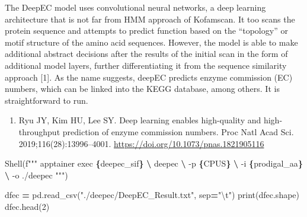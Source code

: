 \documentclass[
]{book}
\newenvironment{Shaded}{\begin{snugshade}}{\end{snugshade}}
\newcommand{\BuiltInTok}[1]{#1}
\newcommand{\CharTok}[1]{\textcolor[rgb]{0.31,0.60,0.02}{#1}}
\newcommand{\DecValTok}[1]{\textcolor[rgb]{0.00,0.00,0.81}{#1}}
\newcommand{\NormalTok}[1]{#1}
\newcommand{\OperatorTok}[1]{\textcolor[rgb]{0.81,0.36,0.00}{\textbf{#1}}}
\newcommand{\SpecialCharTok}[1]{\textcolor[rgb]{0.81,0.36,0.00}{\textbf{#1}}}
\newcommand{\SpecialStringTok}[1]{\textcolor[rgb]{0.31,0.60,0.02}{#1}}
\newcommand{\StringTok}[1]{\textcolor[rgb]{0.31,0.60,0.02}{#1}}
\providecommand{\tightlist}{%
  \setlength{\itemsep}{0pt}\setlength{\parskip}{0pt}}
\begin{document}
The DeepEC model uses convolutional neural networks, a deep learning architecture that is not far from HMM approach of Kofamscan.
It too scans the protein sequence and attempts to predict function based on the ``topology'' or motif structure of the amino acid sequences.
However, the model is able to make additional abstract decisions after the results of the initial scan in the form of additional model layers,
further differentiating it from the sequence similarity approach {[}1{]}. As the name suggests, deepEC predicts enzyme commission (EC) numbers,
which can be linked into the KEGG database, among others. It is straightforward to run.

\begin{enumerate}
\def\labelenumi{\arabic{enumi}.}
\tightlist
\item
  Ryu JY, Kim HU, Lee SY. Deep learning enables high-quality and high-throughput prediction of enzyme commission numbers. Proc Natl Acad Sci. 2019;116(28):13996--4001. \url{https://doi.org/10.1073/pnas.1821905116}
\end{enumerate}

\begin{Shaded}
\begin{Highlighting}[numbers=left,,]
\NormalTok{Shell(}\SpecialStringTok{f"""}
\SpecialStringTok{apptainer exec }\SpecialCharTok{\{}\NormalTok{deepec\_sif}\SpecialCharTok{\}}\SpecialStringTok{ }\OperatorTok{\textbackslash{}}
\SpecialStringTok{    deepec }\OperatorTok{\textbackslash{}}
\SpecialStringTok{        {-}p }\SpecialCharTok{\{}\NormalTok{CPUS}\SpecialCharTok{\}}\SpecialStringTok{ }\OperatorTok{\textbackslash{}}
\SpecialStringTok{        {-}i }\SpecialCharTok{\{}\NormalTok{prodigal\_aa}\SpecialCharTok{\}}\SpecialStringTok{ }\OperatorTok{\textbackslash{}}
\SpecialStringTok{        {-}o ./deepec}
\SpecialStringTok{"""}\NormalTok{)}
\end{Highlighting}
\end{Shaded}

\begin{Shaded}
\begin{Highlighting}[numbers=left,,]
\NormalTok{dfec }\OperatorTok{=}\NormalTok{ pd.read\_csv(}\StringTok{"./deepec/DeepEC\_Result.txt"}\NormalTok{, sep}\OperatorTok{=}\StringTok{"}\CharTok{\textbackslash{}t}\StringTok{"}\NormalTok{)}
\BuiltInTok{print}\NormalTok{(dfec.shape)}
\NormalTok{dfec.head(}\DecValTok{2}\NormalTok{)}
\end{Highlighting}
\end{Shaded}
\end{document}
